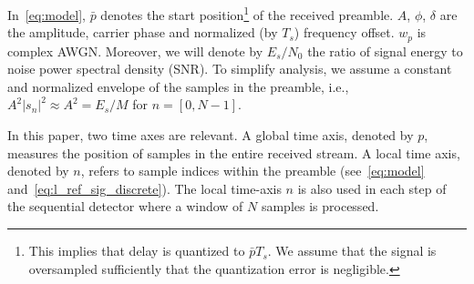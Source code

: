 In~\eqref{eq:model}, $\bar{p}$ denotes the start
position\footnote{This implies that delay is quantized to
  $\bar{p}T_s$. We assume that the signal is oversampled sufficiently
  that the quantization error is negligible.} of the received preamble.
$A$, $\phi$, $\delta$ are the amplitude, carrier phase and normalized
(by $T_s$)
frequency offset.
$w_p$ is complex AWGN.\@
Moreover, we will denote by $E_s/N_0$ the ratio of signal energy to noise power spectral density (SNR).
To simplify analysis, we assume a constant and normalized envelope of the samples in the 
preamble, i.e., $A^2|s_n|^2\approx A^2=E_s/M$ for $n=[0,N-1]$.

In this paper, two time axes are relevant. A global time axis, denoted
by $p$, measures the position of samples in the entire received
stream. A local time axis, denoted by $n$, refers to sample indices
within the preamble (see~\eqref{eq:model}
and~\eqref{eq:l_ref_sig_discrete}).
The local time-axis $n$ is also used in each step of the sequential
detector where a window of $N$ samples is processed.



